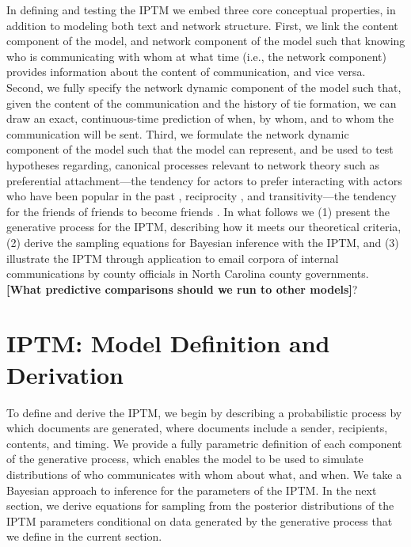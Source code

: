 \documentclass[a4paper]{article}
\begin{document}
In defining and testing the IPTM we embed three core conceptual properties, in addition to modeling both text and network structure. First, we link the content component of the model, and network component of the model such that knowing who is communicating with whom at what time (i.e., the network component) provides information about the content of communication,  and vice versa. Second, we fully specify the network dynamic component of the model such that, given the content of the communication and the history of tie formation, we can draw an exact, continuous-time prediction of when, by whom, and to whom the communication will be sent. Third, we formulate the network dynamic component of the model such that the model can represent, and be used to test hypotheses regarding, canonical processes relevant to network theory such as preferential attachment---the tendency for actors to prefer interacting with actors who have been popular in the past \citep{barabasi1999emergence,vazquez2003growing,jeong2003measuring}, reciprocity \citep{hammer1985implications,rao1987measures}, and transitivity---the tendency for the friends of friends to become friends \citep{louch2000personal,burda2004network}. In what follows we (1) present the generative process for the IPTM, describing how it meets our theoretical criteria, (2) derive the sampling equations for Bayesian inference with the IPTM, and (3) illustrate the IPTM through application to email corpora of internal communications by county officials in North Carolina county governments. {\bf [What predictive comparisons should we run to other models]}?

\section{IPTM: Model Definition and Derivation} \label{sec: Generative Process}

To define and derive the IPTM, we begin by describing a probabilistic process by which documents are generated, where documents include a sender, recipients, contents, and timing. We provide a fully parametric definition of each component of the generative process, which enables the model to be used to simulate distributions of who communicates with whom about what, and when. We take a Bayesian approach to inference for the parameters of the IPTM. In the next section, we derive equations for sampling from the posterior distributions of the IPTM parameters conditional on data generated by the generative process that we define in the current section.
\end{document}
